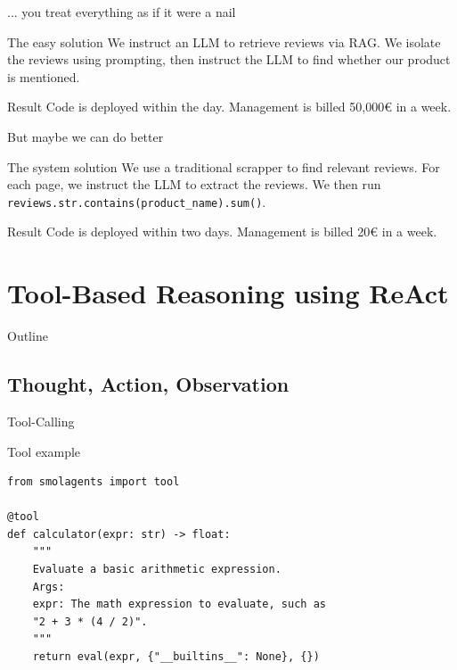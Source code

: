 \documentclass[24pt]{beamer}
\newcommand{\code}[1]{\texttt{#1}}
\begin{document}
\begin{frame}{... you treat everything as if it were a nail}
	\begin{block}{The easy solution}
		We instruct an LLM to retrieve reviews via RAG. We isolate the reviews using prompting, then instruct the LLM to find whether our product is mentioned.
	\end{block}
   	
	\begin{exampleblock}{Result}
		Code is deployed \alert{within the day}. Management is billed \alert{50,000\euro} in a week.
	\end{exampleblock}
\end{frame}

\begin{frame}{But maybe we can do better}
	\begin{block}{The system solution}
		We use a traditional scrapper to find relevant reviews. For each page, we instruct the LLM to extract the reviews. We then run \code{reviews.str.contains(product\_name).sum()}.
	\end{block}
	
	\begin{exampleblock}{Result}
		Code is deployed within \alert{two days}. Management is billed \alert{20\euro} in a week.
	\end{exampleblock}
\end{frame}


\section{Tool-Based Reasoning using ReAct}

\begin{frame}{Outline}
   	\tableofcontents[currentsection]
\end{frame}

\subsection{Thought, Action, Observation}

\begin{frame}
	\sectionpage
	\subsectionpage
\end{frame}

\begin{frame}[fragile]{Tool-Calling}
	\begin{exampleblock}{Tool example}
		
\begin{lstlisting}
from smolagents import tool

@tool
def calculator(expr: str) -> float:
    """
    Evaluate a basic arithmetic expression.
    Args:
    expr: The math expression to evaluate, such as 
    "2 + 3 * (4 / 2)".
    """
    return eval(expr, {"__builtins__": None}, {})
\end{lstlisting}
	
   \end{exampleblock}
\end{frame}
\end{document}

